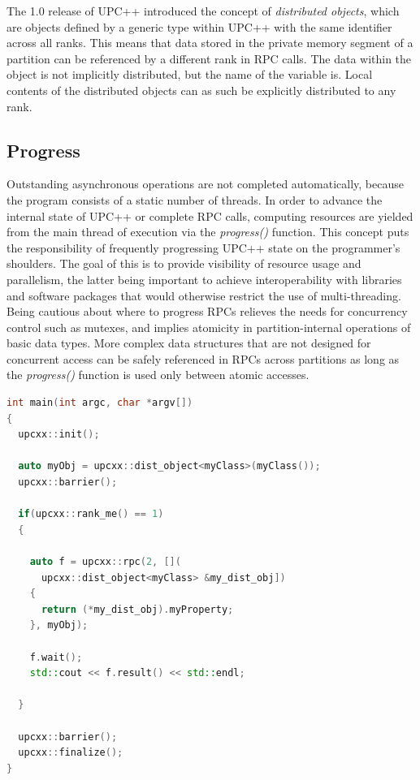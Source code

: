 \documentclass{uit-report}
\begin{document}
The 1.0 release of UPC++ introduced the concept of \emph{distributed objects}, which are objects defined by a generic type within UPC++ with the same identifier across all ranks. This means that data stored in the private memory segment of a partition can be referenced by a different rank in RPC calls. The data within the object is not implicitly distributed, but the name of the variable is. Local contents of the distributed objects can as such be explicitly distributed to any rank.

\subsection{Progress}
Outstanding asynchronous operations are not completed automatically, because the program consists of a static number of threads. In order to advance the internal state of UPC++ or complete RPC calls, computing resources are yielded from the main thread of execution via the \emph{progress()} function. This concept puts the responsibility of frequently progressing UPC++ state on the programmer's shoulders. The goal of this is to provide visibility of resource usage and parallelism, the latter being important to achieve interoperability with libraries and software packages that would otherwise restrict the use of multi-threading. Being cautious about where to progress RPCs relieves the needs for concurrency control such as mutexes, and implies atomicity in partition-internal operations of basic data types. More complex data structures that are not designed for concurrent access can be safely referenced in RPCs across partitions as long as the \emph{progress()} function is used only between atomic accesses.

\begin{lstlisting}[label={lst:distribobj}, float=t,frame=tlrb, caption={Communication through RPC, referencing a distributed object of an arbitrary C++ class. Rank 1 retrieves and prints \emph{myProperty} from rank 2's instance of \emph{myObj}.}, captionpos=b, language=c++, showstringspaces=false]
int main(int argc, char *argv[])
{
  upcxx::init();

  auto myObj = upcxx::dist_object<myClass>(myClass());
  upcxx::barrier();

  if(upcxx::rank_me() == 1)
  {
  
    auto f = upcxx::rpc(2, [](
      upcxx::dist_object<myClass> &my_dist_obj])
    {
      return (*my_dist_obj).myProperty;
    }, myObj);

    f.wait();
    std::cout << f.result() << std::endl;
    
  }

  upcxx::barrier();
  upcxx::finalize();
} 
\end{lstlisting}
\end{document}
